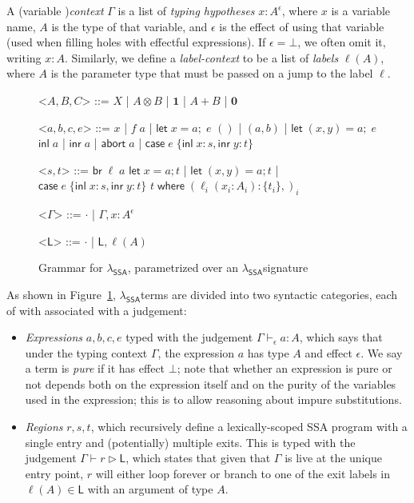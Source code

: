 \documentclass[acmsmall,screen,review]{acmart}
\newcommand{\ms}[1]{\ensuremath{\mathsf{#1}}}
\newcommand{\lto}{:}
\newcommand{\linl}[1]{\ms{inl}\;{#1}}
\newcommand{\linr}[1]{\ms{inr}\;{#1}}
\newcommand{\labort}[1]{\ms{abort}\;{#1}}
\newcommand{\letexpr}[3]{\ensuremath{\ms{let}\;#1 = #2;\;#3}}
\newcommand{\caseexpr}[5]{\ms{case}\;#1\;\{\linl{#2} \lto #3, \linr{#4} \lto #5\}}
\newcommand{\letstmt}[3]{\ensuremath{\ms{let}\;#1 = #2; #3}}
\newcommand{\brb}[2]{\ms{br}\;#1\;#2}
\newcommand{\casestmt}[5]{\ms{case}\;#1\;\{\linl{#2} \lto #3, \linr{#4} \lto #5\}}
\newcommand{\where}[2]{#1\;\ms{where}\;#2}
\newcommand{\wbranch}[3]{#1(#2) \lto \{#3\}}
\newcommand{\thyp}[3]{#1 : {#2}^{#3}}
\newcommand{\bhyp}[2]{#1 : #2}
\newcommand{\lhyp}[2]{#1(#2)}
\newcommand{\hasty}[4]{#1 \vdash_{#2} #3: {#4}}
\newcommand{\haslb}[3]{#1 \vdash #2 \rhd #3}
\newcommand{\isotopessa}{\(\lambda_{\ms{SSA}}\)}
\begin{document}
A (variable )\textit{context} $\Gamma$ is a list of \textit{typing hypotheses}
$\thyp{x}{A}{\epsilon}$, where $x$ is a variable name, $A$ is the type of that
variable, and $\epsilon$ is the effect of using that variable (used when filling
holes with effectful expressions). If $\epsilon = \bot$, we often omit it,
writing $\bhyp{x}{A}$. Similarly, we define a \textit{label-context} to be a
list of \textit{labels} $\lhyp{\ell}{A}$, where $A$ is the parameter type that
must be passed on a jump to the label $\ell$.

\begin{figure}[H]
  \begin{center}
    \begin{grammar}
      <\(A, B, C\)> ::= 
      \(X\)
      \;|\; \(A \otimes B\)
      \;|\; \(\mathbf{1}\)
      \;|\; \(A + B\)
      \;|\; \(\mathbf{0}\)

      <\(a, b, c, e\)> ::= \(x\) 
      \;|\;  \(f\;a\)
      \;|\; \(\letexpr{x}{a}{e}\)
      \alt  \(()\)
      \;|\; \((a, b)\)
      \;|\; \(\letexpr{(x, y)}{a}{e}\)
      \alt  \(\linl{a}\) 
      \;|\; \(\linr{a}\)
      \;|\; \(\labort{a}\)
      \;|\; \(\caseexpr{e}{x}{s}{y}{t}\)
      
      <\(s, t\)> ::= \(\brb{\ell}{a}\) 
      \alt  \(\letstmt{x}{a}{t}\)
      \;|\; \(\letstmt{(x, y)}{a}{t}\)
      \;|\; \(\casestmt{e}{x}{s}{y}{t}\)
      \alt  \(\where{t}{(\wbranch{\ell_i}{x_i: A_i}{t_i},)_i}\)

      <\(\Gamma\)> ::= \(\cdot\) \;|\; \(\Gamma, \thyp{x}{A}{\epsilon}\)

      <\(\ms{L}\)> ::= \(\cdot\) \;|\; \(\ms{L}, \lhyp{\ell}{A}\)
    \end{grammar}
  \end{center}
  \caption{Grammar for \isotopessa, parametrized over an \isotopessa signature}
  \Description{}
  \label{fig:ssa-grammar}
\end{figure}

As shown in Figure~\ref{fig:ssa-grammar}, \isotopessa terms are divided into two
syntactic categories, each of with associated with a judgement:
\begin{itemize}
  \item \emph{Expressions} $a, b, c, e$ typed with the judgement
  $\hasty{\Gamma}{\epsilon}{a}{A}$, which says that under the typing context
  $\Gamma$, the expression $a$ has type $A$ and effect $\epsilon$. We say a term
  is \emph{pure} if it has effect $\bot$; note that whether an expression is
  pure or not depends both on the expression itself and on the purity of the
  variables used in the expression; this is to allow reasoning about impure
  substitutions.
  \item \emph{Regions} $r, s, t$, which recursively define a lexically-scoped
  SSA program with a single entry and (potentially) multiple exits. This is
  typed with the judgement $\haslb{\Gamma}{r}{\ms{L}}$, which states that given
  that $\Gamma$ is live at the unique entry point, $r$ will either loop forever
  or branch to one of the exit labels in $\ell(A) \in \ms{L}$ with an argument
  of type $A$.
\end{itemize}
\end{document}
